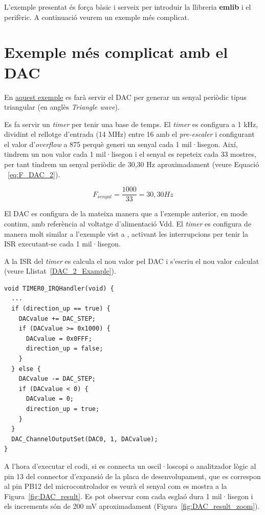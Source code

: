 L'exemple presentat és força bàsic i serveix per introduir la llibreria {\bf emlib} i el perifèric. A continuació veurem un exemple més complicat.

\section{Exemple més complicat amb el DAC}
\label{sec:DAC_Example_2}
En \href{https://github.com/mariusmm/cursembedded/tree/master/Simplicity/DAC_2}{aquest exemple} es farà servir el \gls{DAC} per generar un senyal periòdic tipus triangular (en anglès {\em Triangle wave}).

Es fa servir un {\em timer} per tenir una base de temps. El {\em timer} es configura a 1 kHz, dividint el rellotge d'entrada (14 MHz) entre 16 amb el {\em pre-escaler} i configurant el valor d'{\em overflow} a 875 perquè generi un senyal cada 1 mil·lisegon. Així, tindrem un nou valor cada 1 mil·lisegon i el senyal es repeteix cada 33 mostres, per tant tindrem un senyal periòdic de 30,30 Hz aproximadament (veure Equació ~\ref{eq:F_DAC_2}).

\begin{equation}
\label{eq:F_DAC_2}
 F_{senyal} = \frac{1000}{33} = 30,30 Hz
\end{equation}

El DAC es configura de la mateixa manera que a l'exemple anterior, en mode continu, amb referència al voltatge d'alimentació \gls{Vdd}. El {\em timer} es configura de manera molt similar a l'exemple vist a , activant les interrupcions per tenir la ISR executant-se cada 1 mil·lisegon.

A la \gls{ISR} del {\em timer} es calcula el nou valor pel \gls{DAC} i s'escriu el nou valor calculat (veure Llistat~\ref{DAC_2_Example}).

\begin{lstlisting}[style=customc, caption=Part de la ISR del Timer per generar la dada pel DAC, label=DAC_2_Example]
void TIMER0_IRQHandler(void) {
  ...
  if (direction_up == true) {
    DACvalue += DAC_STEP;
    if (DACvalue >= 0x1000) {
      DACvalue = 0x0FFF;
      direction_up = false;
    }
  } else {
    DACvalue -= DAC_STEP;
    if (DACvalue < 0) {
      DACvalue = 0;
      direction_up = true;
    }
  }
  DAC_ChannelOutputSet(DAC0, 1, DACvalue);
}
\end{lstlisting}

A l'hora d'executar el codi, si es connecta un oscil·loscopi o analitzador lògic al pin 13 del connector d'expansió de la placa de desenvolupament, que es correspon al pin PB12 del microcontrolador es veurà el senyal com es mostra a la Figura~\ref{fig:DAC_result}. Es pot observar com cada esglaó dura 1 mil·lisegon i els increments són de 200 mV aproximadament (Figura~\ref{fig:DAC_result_zoom}).

